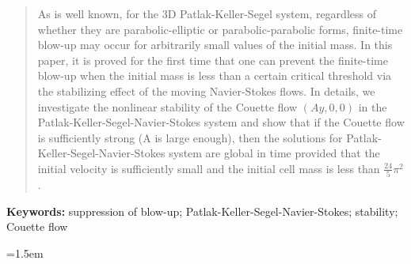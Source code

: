 \documentclass[12pt, reqno]{amsart}
\numberwithin{equation}{section}
\begin{document}
\vspace{-0.4cm}
\begin{abstract}
	As is well known, for the 3D Patlak-Keller-Segel system, regardless of whether they are parabolic-elliptic or parabolic-parabolic forms,  finite-time blow-up  may occur for arbitrarily small values of the initial mass. In this paper, it is proved for the first time that one can prevent the finite-time blow-up when the initial mass is less than a certain critical threshold via the stabilizing effect of the moving Navier-Stokes flows.
	In details, we investigate the nonlinear stability 
	of the Couette flow $(Ay, 0, 0)$ in the
	Patlak-Keller-Segel-Navier-Stokes system 
	and \textcolor[rgb]{0,0,0}{show} that if the Couette flow is sufficiently strong (A is large enough), then the solutions for Patlak-Keller-Segel-Navier-Stokes system are global in time provided that the initial velocity is sufficiently small and  the initial cell mass is less than $\frac{24}{5} \pi^2$. 
	
	
\end{abstract}

{\small {\bf Keywords:} 	suppression of blow-up;		Patlak-Keller-Segel-Navier-Stokes; stability; 
	Couette flow}
\tableofcontents


\parskip5pt
\parindent=1.5em
\end{document}
